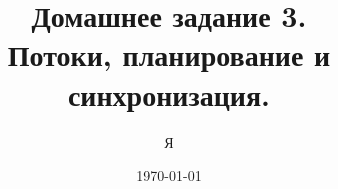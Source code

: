 \documentclass[12pt,a4paper,oneside]{article}
\title{Домашнее задание 3. \\ Потоки, планирование и синхронизация.}
\author{Я}
\date{\today}
\begin{document}
  \sloppy
  \maketitle
  \tableofcontents
  \clearpage

  
  
  
  
  

\end{document}
